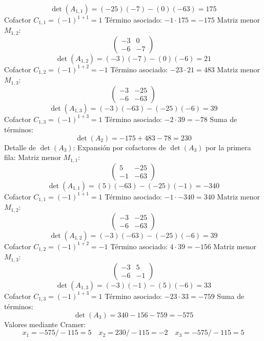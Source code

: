 \documentclass{article}
\begin{document}
\[\det(A_{1,1}) = (-25)(-7) - (0)(-63) = 175\]
Cofactor $C_{1,1} = (-1)^{1+1} = 1$
Término asociado: $ -1 \cdot 175 = -175 $
Matriz menor $M_{1,2}$:
\[\begin{pmatrix}-3 & 0 \\ -6 & -7\end{pmatrix}\]
\[\det(A_{1,2}) = (-3)(-7) - (0)(-6) = 21\]
Cofactor $C_{1,2} = (-1)^{1+2} = -1$
Término asociado: $ -23 \cdot 21 = 483 $
Matriz menor $M_{1,3}$:
\[\begin{pmatrix}-3 & -25 \\ -6 & -63\end{pmatrix}\]
\[\det(A_{1,3}) = (-3)(-63) - (-25)(-6) = 39\]
Cofactor $C_{1,3} = (-1)^{1+3} = 1$
Término asociado: $ -2 \cdot 39 = -78 $
Suma de términos:
\[\det(A_{2}) = -175 + 483 - 78 = 230\]
Detalle de $\det(A_{3})$:
Expansión por cofactores de $\det(A_{3})$ por la primera fila:
Matriz menor $M_{1,1}$:
\[\begin{pmatrix}5 & -25 \\ -1 & -63\end{pmatrix}\]
\[\det(A_{1,1}) = (5)(-63) - (-25)(-1) = -340\]
Cofactor $C_{1,1} = (-1)^{1+1} = 1$
Término asociado: $ -1 \cdot -340 = 340 $
Matriz menor $M_{1,2}$:
\[\begin{pmatrix}-3 & -25 \\ -6 & -63\end{pmatrix}\]
\[\det(A_{1,2}) = (-3)(-63) - (-25)(-6) = 39\]
Cofactor $C_{1,2} = (-1)^{1+2} = -1$
Término asociado: $ 4 \cdot 39 = -156 $
Matriz menor $M_{1,3}$:
\[\begin{pmatrix}-3 & 5 \\ -6 & -1\end{pmatrix}\]
\[\det(A_{1,3}) = (-3)(-1) - (5)(-6) = 33\]
Cofactor $C_{1,3} = (-1)^{1+3} = 1$
Término asociado: $ -23 \cdot 33 = -759 $
Suma de términos:
\[\det(A_{3}) = 340 - 156 - 759 = -575\]
Valores mediante Cramer:
\[x_1 = -575/-115 = 5\quad x_2 = 230/-115 = -2\quad x_3 = -575/-115 = 5\]
\end{document}
